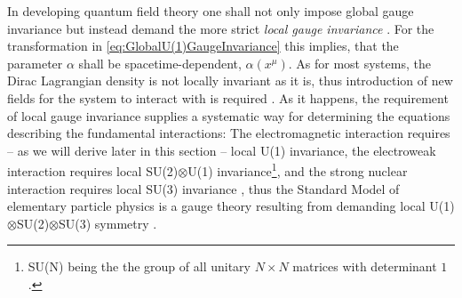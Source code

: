 \documentclass[../main.tex]{subfiles} %
\begin{document}
In developing quantum field theory one shall not only impose global gauge invariance but instead demand the more strict \emph{local gauge invariance} \cite{griffiths_introToElementaryParticles_2008}. For the transformation in \cref{eq:GlobalU(1)GaugeInvariance} this implies, that the parameter $\alpha$ shall be spacetime-dependent, $\alpha(x^\mu)$. As for most systems, the Dirac Lagrangian density is not locally invariant as it is, thus introduction of new fields for the system to interact with is required \cite{panyella_masterThesis_2019}. As it happens, the requirement of local gauge invariance supplies a systematic way for determining the equations describing the fundamental interactions: The electromagnetic interaction requires -- as we will derive later in this section -- local U(1) invariance, the electroweak interaction requires local SU(2)$\otimes$U(1) invariance\footnote{SU(N) being the the group of all unitary $N \times N$ matrices with determinant $1$ \cite{peskin_introToQFT_1995}.}, and the strong nuclear interaction requires local SU(3) invariance \cite{stanford_QFT, griffiths_introToElementaryParticles_2008}, thus the Standard Model of elementary particle physics is a gauge theory resulting from demanding local U(1)$\otimes$SU(2)$\otimes$SU(3) symmetry \cite{stanford_historyOfQFT}.
\end{document}
